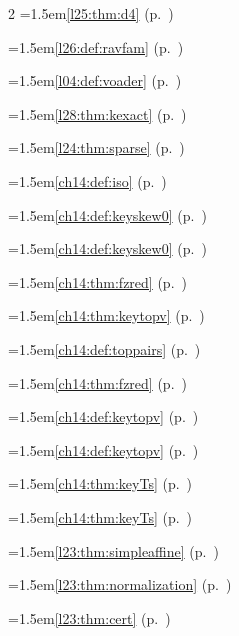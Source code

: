 \begin{multicols}{2}
\hangindent=1.5em\quad \ref{l25:thm:d4} (p.~\pageref{l25:thm:d4})\par
\hangindent=1.5em\quad \ref{l26:def:ravfam} (p.~\pageref{l26:def:ravfam})\par
\hangindent=1.5em\quad \ref{l04:def:voader} (p.~\pageref{l04:def:voader})\par
\hangindent=1.5em\quad \ref{l28:thm:kexact} (p.~\pageref{l28:thm:kexact})\par
\hangindent=1.5em\quad \ref{l24:thm:sparse} (p.~\pageref{l24:thm:sparse})\par
\hangindent=1.5em\quad \ref{ch14:def:iso} (p.~\pageref{ch14:def:iso})\par
\hangindent=1.5em\quad \ref{ch14:def:keyskew0} (p.~\pageref{ch14:def:keyskew0})\par
\hangindent=1.5em\quad \ref{ch14:def:keyskew0} (p.~\pageref{ch14:def:keyskew0})\par
\hangindent=1.5em\quad \ref{ch14:thm:fzred} (p.~\pageref{ch14:thm:fzred})\par
\hangindent=1.5em\quad \ref{ch14:thm:keytopv} (p.~\pageref{ch14:thm:keytopv})\par
\hangindent=1.5em\quad \ref{ch14:def:toppairs} (p.~\pageref{ch14:def:toppairs})\par
\hangindent=1.5em\quad \ref{ch14:thm:fzred} (p.~\pageref{ch14:thm:fzred})\par
\hangindent=1.5em\quad \ref{ch14:def:keytopv} (p.~\pageref{ch14:def:keytopv})\par
\hangindent=1.5em\quad \ref{ch14:def:keytopv} (p.~\pageref{ch14:def:keytopv})\par
\hangindent=1.5em\quad \ref{ch14:thm:keyTs} (p.~\pageref{ch14:thm:keyTs})\par
\hangindent=1.5em\quad \ref{ch14:thm:keyTs} (p.~\pageref{ch14:thm:keyTs})\par
\hangindent=1.5em\quad \ref{l23:thm:simpleaffine} (p.~\pageref{l23:thm:simpleaffine})\par
\hangindent=1.5em\quad \ref{l23:thm:normalization} (p.~\pageref{l23:thm:normalization})\par
\hangindent=1.5em\quad \ref{l23:thm:cert} (p.~\pageref{l23:thm:cert})\par

\end{multicols}
